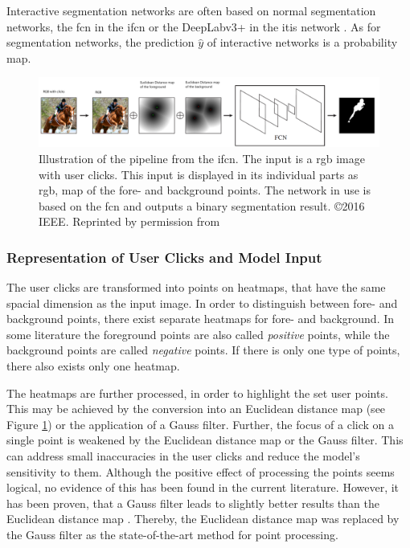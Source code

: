 Interactive segmentation networks are often based on normal segmentation networks, \eg the \gls{fcn} in the \gls{ifcn} \cite{Xu16-InteractiveObjectSelection} or the DeepLabv3+ in the \gls{itis} network \cite{MVL18-ITIS}.
As for segmentation networks, the prediction $\hat{y}$ of interactive networks is a probability map.

\begin{figure} [!b]
	\includegraphics[width=\linewidth]{figures/chap232_ifcn.png}
	\caption[Interactively Fully Convolutional Network]{
		Illustration of the pipeline from the \gls{ifcn}.
		The input is a \gls{rgb} image with user clicks.
		This input is displayed in its individual parts as \gls{rgb}, map of the fore- and background points.
		The network in use is based on the \gls{fcn} and outputs a binary segmentation result.
		\copyright 2016 IEEE. Reprinted by permission from \cite{Xu16-InteractiveObjectSelection}
	}\label{fig:ch2:sec3:ifcn}
\end{figure}

\subsubsection{Representation of User Clicks and Model Input}
The user clicks are transformed into points on heatmaps, that have the same spacial dimension as the input image.
In order to distinguish between fore- and background points, there exist separate heatmaps for fore- and background.
In some literature the foreground points are also called \textit{positive} points, while the background points are called \textit{negative} points.
If there is only one type of points, there also exists only one heatmap.

The heatmaps are further processed, in order to highlight the set user points.
This may be achieved by the conversion into an Euclidean distance map \cite{Dan80-EuclideanDistanceMapping} (see Figure \ref{fig:ch2:sec3:ifcn}) or the application of a Gauss filter.
Further, the focus of a click on a single point is weakened by the Euclidean distance map or the Gauss filter.
This can address small inaccuracies in the user clicks and reduce the model's sensitivity to them.
Although the positive effect of processing the points seems logical, no evidence of this has been found in the current literature.
However, it has been proven, that a Gauss filter leads to slightly better results than the Euclidean distance map \cite{Man18-DEXTR} \cite{MVL18-ITIS}.
Thereby, the Euclidean distance map was replaced by the Gauss filter as the state-of-the-art method for point processing.

